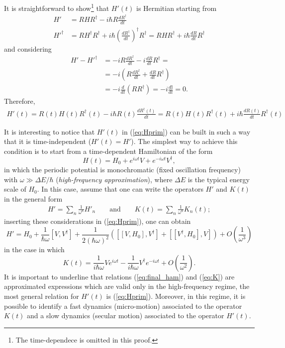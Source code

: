 It is straightforward to show\footnote{The time-dependece is omitted in this proof.} that $H'(t)$ is Hermitian starting from
\begin{align*}
    H' &= R H R^\dagger - i \hbar R \frac{dR^\dagger}{dt} \\
    H'^\dagger &= R H^\dagger R^\dagger + i \hbar \left( \frac{d R^\dagger}{dt} \right)^\dagger R^\dagger = R H R^\dagger + i \hbar \frac{dR}{dt} R^\dagger
\end{align*}
and considering
\begin{align*}
    H'- H'^\dagger &= -i R \frac{d R^\dagger}{dt} - i \frac{d R}{dt} R^\dagger = \\
    &= -i\left( R \frac{d R^\dagger}{dt} + \frac{d R}{dt} R^\dagger \right) \\
    &= -i \frac{d}{dt} (R R^\dagger) = -i \frac{d \mathbb{I}}{dt} = 0. 
\end{align*}
Therefore,
\begin{align}
    \label{eq:Hprim}
    H'(t) = R(t) H(t) R^\dagger(t) - i \hbar R(t) \frac{dR^\dagger(t)}{dt} = R(t) H(t) R^\dagger(t) + i \hbar \frac{dR(t)}{dt} R^\dagger(t) 
\end{align}


It is interesting to notice that $H'(t)$ in (\ref{eq:Hprim}) can be built in such a way that it is time-independent ($H'(t) = H'$). The simplest way to achieve this condition is to start from a time-dependent Hamiltonian of the form
\begin{equation}
    \label{eq:start_ham}
    H(t) = H_0 + e^{i \omega t} V + e^{-i \omega t} V^\dagger,
\end{equation}
in which the periodic potential is monochromatic (fixed oscillation frequency) with $\omega \gg \Delta E/\hbar$ (\textit{high-frequency approximation}), where $\Delta E$ is the typical energy scale of $H_0$. In this case, assume that one can write the operators $H'$ and $K(t)$ in the general form
\begin{align*}
    H' = \sum_n \frac{1}{\omega^n} H'_n \qquad \text{and} \qquad
    K(t) = \sum_n \frac{1}{\omega^n} K_n(t);
\end{align*}
inserting these considerations in (\ref{eq:Hprim}), one can obtain
\begin{equation}
    \label{eq:final_ham}
    H' = H_0 + \frac{1}{\hbar \omega} [V,V^\dagger] + \frac{1}{2 (\hbar \omega)^2} \left( [[V,H_0],V^\dagger] + [[V^\dagger,H_0],V] \right) + O\left( \frac{1}{\omega^3} \right)
\end{equation}
in the case in which 
\begin{equation}
    \label{eq:K}
    K(t) = \frac{1}{i \hbar \omega } V e^{i \omega t} - \frac{1}{i \hbar \omega} V^\dagger e^{-i \omega t} + O \left( \frac{1}{\omega^2} \right). 
\end{equation}
It is important to underline that relations (\ref{eq:final_ham}) and (\ref{eq:K}) are approximated expressions which are valid only in the high-frequency regime, the most general relation for $H'(t)$ is (\ref{eq:Hprim}). Moreover, in this regime, it is possible to identify a fast dynamics (micro-motion) associated to the operator $K(t)$ and a slow dynamics (secular motion) associated to the operator $H'(t)$.

